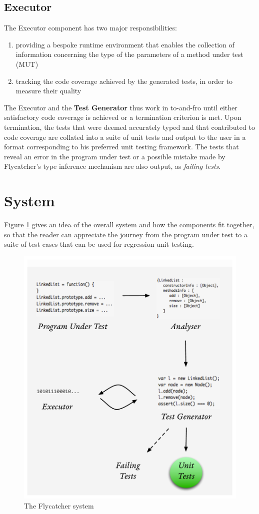 \subsection{Executor}
The \textsf{Executor} component has two major responsibilities:
\begin{enumerate}
   \item providing a bespoke runtime environment that enables the collection of information concerning the type of the parameters of a method under test (MUT)
   \item tracking the code coverage achieved by the generated tests, in order to measure their quality
\end{enumerate}

The \textsf{Executor} and the \textbf{Test Generator} thus work in to-and-fro until either satisfactory code coverage is achieved or a termination criterion is met. Upon termination, the tests that were deemed accurately typed and that contributed to code coverage are collated into a suite of unit tests and output to the user in a format corresponding to his preferred unit testing framework. The tests that reveal an error in the program under test or a possible mistake made by \textsf{Flycatcher}'s type inference mechanism are also output, as \emph{failing tests}.

\section{System}
Figure \ref{system} gives an idea of the overall system and how the components fit together, so that the reader can appreciate the journey from the program under test to a suite of test cases that can be used for regression unit-testing.

\begin{figure}[h]
\hspace*{-0.3cm}
\includegraphics[scale=0.65]{./components/chapter3/system9.pdf}
\caption{The \textsf{Flycatcher} system}
\label{system}
\end{figure}